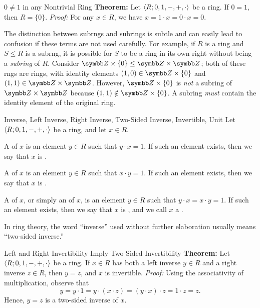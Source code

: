 \begin{thmbox}{$0 \ne 1$ in any Nontrivial Ring}
	\textbf{Theorem:} Let ${\langle {R; 0, 1, -, +, \cdot} \rangle}$ be a ring. If $0 = 1$, then $R = \{0\}$.
\tcblower
	\textit{Proof:} For any $x \in R$, we have $x = 1 \cdot x = 0 \cdot x = 0$.
\end{thmbox}



The distinction between subrngs and subrings is subtle and can easily lead to confusion if these terms are not used carefully. For example, if $R$ is a ring and $S \le R$ is a subrng, it is possible for $S$ to be a ring in its own right without being a \textit{subring} of $R$. Consider $\Z \times \{0\} \le \Z \times \Z$; both of these rngs are rings, with identity elements $(1, 0) \in \Z \times \{0\}$ and $(1, 1) \in \Z \times \Z$. However, $\Z \times \{0\}$ is \textit{not} a subring of $\Z \times \Z$ because $(1, 1) \notin \Z \times \{0\}$. A subring \textit{must} contain the identity element of the original ring.

\begin{dfnbox}{Inverse, Left Inverse, Right Inverse, Two-Sided Inverse, Invertible, Unit}
	Let ${\langle {R; 0, 1, -, +, \cdot} \rangle}$ be a ring, and let $x \in R$.
	\begin{dfnitems}
		\item A  of $x$ is an element $y \in R$ such that $y \cdot x = 1$. If such an element exists, then we say that $x$ is .
		\item A  of $x$ is an element $y \in R$ such that $x \cdot y = 1$. If such an element exists, then we say that $x$ is .
		\item A  of $x$, or simply an  of $x$, is an element $y \in R$ such that $y \cdot x = x \cdot y = 1$. If such an element exists, then we say that $x$ is , and we call $x$ a .
	\end{dfnitems}
\end{dfnbox}

In ring theory, the word ``inverse'' used without further elaboration usually means ``two-sided inverse.''

\begin{thmbox}{Left and Right Invertibility Imply Two-Sided Invertibility}
	\textbf{Theorem:} Let ${\langle {R; 0, 1, -, +, \cdot} \rangle}$ be a ring. If $x \in R$ has both a left inverse $y \in R$ and a right inverse $z \in R$, then $y = z$, and $x$ is invertible.
\tcblower
	\textit{Proof:} Using the associativity of multiplication, observe that
	\[ y = y \cdot 1 = y \cdot (x \cdot z) = (y \cdot x) \cdot z = 1 \cdot z = z. \]
	Hence, $y = z$ is a two-sided inverse of $x$.
\end{thmbox}

